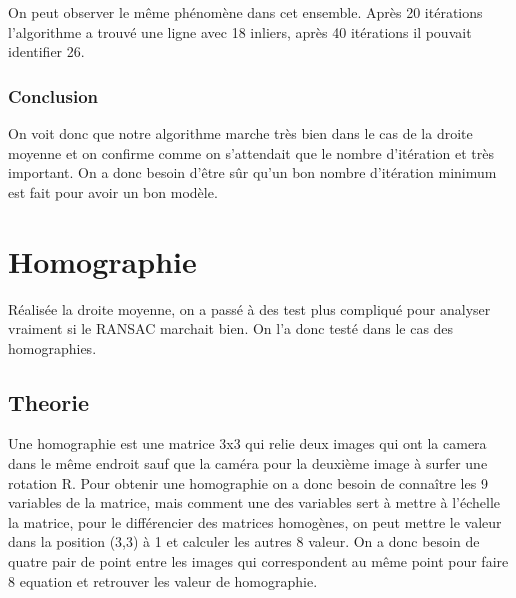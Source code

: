 \documentclass[11pt]{article}
\begin{document}
\begin{figure}[H]
\begin{minipage}{.5\textwidth}
  \label{fig:test2}
\end{minipage}
\end{figure}

On peut observer le même phénomène dans cet ensemble. Après 20 itérations l'algorithme a trouvé une ligne avec 18 inliers, après 40 itérations il pouvait identifier 26. 

\subsubsection{Conclusion}

On voit donc que notre algorithme marche très bien dans le cas de la droite moyenne et on confirme comme on s'attendait que le nombre d'itération et très important. On a donc besoin d’être sûr qu’un bon nombre d'itération minimum est fait pour avoir un bon modèle.

\section{Homographie}

Réalisée la droite moyenne, on a passé à des test plus compliqué pour analyser vraiment si le RANSAC marchait bien. On l’a donc testé dans le cas des homographies. 

\subsection{Theorie}

Une homographie est une matrice 3x3 qui relie deux images qui ont la camera dans le même endroit sauf que la caméra pour la deuxième image à surfer une rotation R. Pour obtenir une homographie on a donc besoin de connaître les 9 variables de la matrice, mais comment une des variables sert à mettre à l'échelle la matrice, pour le différencier des matrices homogènes, on peut mettre le valeur dans la position (3,3) à 1 et calculer les autres 8 valeur. On a donc besoin de quatre pair de point entre les images qui correspondent au même point pour faire 8 equation et retrouver les valeur de homographie. \\
\end{document}
